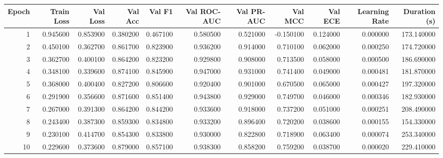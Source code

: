 \begin{tabular}{rrrrrrrrrrr}
\toprule
Epoch & Train Loss & Val Loss & Val Acc & Val F1 & Val ROC-AUC & Val PR-AUC & Val MCC & Val ECE & Learning Rate & Duration (s) \\
\midrule
1 & 0.945600 & 0.853900 & 0.380200 & 0.467100 & 0.580500 & 0.521000 & -0.150100 & 0.124000 & 0.000000 & 173.140000 \\
2 & 0.450100 & 0.362700 & 0.861700 & 0.823900 & 0.936200 & 0.914000 & 0.710100 & 0.062000 & 0.000250 & 174.720000 \\
3 & 0.362700 & 0.400100 & 0.864200 & 0.823200 & 0.929800 & 0.908000 & 0.713500 & 0.058000 & 0.000500 & 186.690000 \\
4 & 0.348100 & 0.339600 & 0.874100 & 0.845900 & 0.947000 & 0.931000 & 0.741400 & 0.049000 & 0.000481 & 181.870000 \\
5 & 0.368000 & 0.400400 & 0.827200 & 0.806600 & 0.920400 & 0.901000 & 0.670500 & 0.065000 & 0.000427 & 197.320000 \\
6 & 0.291900 & 0.356600 & 0.871600 & 0.851400 & 0.943800 & 0.929000 & 0.749700 & 0.046000 & 0.000346 & 182.930000 \\
7 & 0.267000 & 0.391300 & 0.864200 & 0.844200 & 0.933600 & 0.918000 & 0.737200 & 0.051000 & 0.000251 & 208.490000 \\
8 & 0.243400 & 0.387300 & 0.859300 & 0.834800 & 0.933200 & 0.896400 & 0.720200 & 0.038600 & 0.000155 & 154.330000 \\
9 & 0.230100 & 0.414700 & 0.854300 & 0.833800 & 0.930000 & 0.822800 & 0.718900 & 0.063400 & 0.000074 & 253.340000 \\
10 & 0.229600 & 0.373600 & 0.879000 & 0.857100 & 0.938300 & 0.858200 & 0.759200 & 0.038700 & 0.000020 & 229.410000 \\
\bottomrule
\end{tabular}
